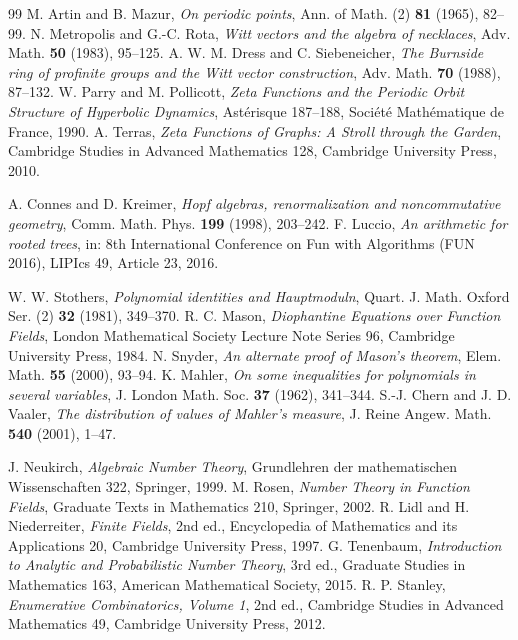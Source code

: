 \documentclass[11pt]{article}
\begin{document}
\begin{thebibliography}{99}
 M. Artin and B. Mazur, \emph{On periodic points}, Ann. of Math. (2) \textbf{81} (1965), 82--99.
 N. Metropolis and G.-C. Rota, \emph{Witt vectors and the algebra of necklaces}, Adv. Math. \textbf{50} (1983), 95--125.
 A. W. M. Dress and C. Siebeneicher, \emph{The Burnside ring of profinite groups and the Witt vector construction}, Adv. Math. \textbf{70} (1988), 87--132.
 W. Parry and M. Pollicott, \emph{Zeta Functions and the Periodic Orbit Structure of Hyperbolic Dynamics}, Ast\'erisque 187--188, Soci\'et\'e Math\'ematique de France, 1990.
 A. Terras, \emph{Zeta Functions of Graphs: A Stroll through the Garden}, Cambridge Studies in Advanced Mathematics 128, Cambridge University Press, 2010.

 A. Connes and D. Kreimer, \emph{Hopf algebras, renormalization and noncommutative geometry}, Comm. Math. Phys. \textbf{199} (1998), 203--242.
 F. Luccio, \emph{An arithmetic for rooted trees}, in: 8th International Conference on Fun with Algorithms (FUN 2016), LIPIcs 49, Article 23, 2016.

 W. W. Stothers, \emph{Polynomial identities and Hauptmoduln}, Quart. J. Math. Oxford Ser. (2) \textbf{32} (1981), 349--370.
 R. C. Mason, \emph{Diophantine Equations over Function Fields}, London Mathematical Society Lecture Note Series 96, Cambridge University Press, 1984.
 N. Snyder, \emph{An alternate proof of Mason's theorem}, Elem. Math. \textbf{55} (2000), 93--94.
 K. Mahler, \emph{On some inequalities for polynomials in several variables}, J. London Math. Soc. \textbf{37} (1962), 341--344.
 S.-J. Chern and J. D. Vaaler, \emph{The distribution of values of Mahler's measure}, J. Reine Angew. Math. \textbf{540} (2001), 1--47.

 J. Neukirch, \emph{Algebraic Number Theory}, Grundlehren der mathematischen Wissenschaften 322, Springer, 1999.
 M. Rosen, \emph{Number Theory in Function Fields}, Graduate Texts in Mathematics 210, Springer, 2002.
 R. Lidl and H. Niederreiter, \emph{Finite Fields}, 2nd ed., Encyclopedia of Mathematics and its Applications 20, Cambridge University Press, 1997.
 G. Tenenbaum, \emph{Introduction to Analytic and Probabilistic Number Theory}, 3rd ed., Graduate Studies in Mathematics 163, American Mathematical Society, 2015.
 R. P. Stanley, \emph{Enumerative Combinatorics, Volume 1}, 2nd ed., Cambridge Studies in Advanced Mathematics 49, Cambridge University Press, 2012.


\end{thebibliography}
\end{document}
